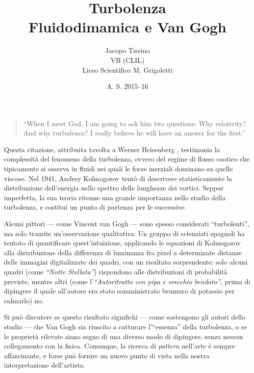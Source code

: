 \documentclass[12pt,a4paper]{article}
\author{Jacopo Tissino \\
VB
(CLIL)\\
Liceo Scientifico M. Grigoletti}
\date{A. S. 2015--16}
\title{\huge{\textbf{Turbolenza}}\\
\Large{Fluidodimamica e Van Gogh}}
\numberwithin{equation}{subsection}
\begin{document}
\maketitle

\begin{quote}
``When I meet God, I am going to ask him two questions: Why relativity? And why turbulence? I really believe he will have an answer for the first.''
\end{quote}

Questa citazione, attribuita tavolta a Werner Heisenberg \cite{heisenberg}, testimonia la complessità del fenomeno della turbolenza, ovvero del regime di flusso caotico che tipicamente si osserva in fluidi nei quali le forze inerziali dominano su quelle viscose. 
Nel 1941, Andrey Kolmogorov tentò di descrivere statisticamente la distribuzione dell'energia nello spettro delle lunghezze dei vortici. Seppur imperfetta, la sua teoria ritenne una grande importanza nello studio della turbolenza, e costituì un punto di partenza per le successive.

Alcuni pittori --- come Vincent van Gogh --- sono spesso considerati ``turbolenti'', ma solo tramite un'osservazione qualitativa. Un gruppo di scienziati spagnoli \cite{study2006} ha tentato di quantificare quest'intuizione, applicando le equazioni di Kolmogorov alla distribuzione della differenza di luminanza fra pixel a determinate distanze delle immagini digitalizzate dei quadri, con un risultato sorprendente: solo alcuni quadri (come \emph{``Notte Stellata''}) rispondono alle distribuzioni di probabilità previste, mentre altri (come l'\emph{``Autoritratto con pipa e orecchio bendato''}, prima di dipingere il quale all'autore era stato somministrato brumuro di potassio per calmarlo) no.

Si può discutere se questo risultato significhi --- come sostengono gli autori dello studio --- che Van Gogh sia riuscito a catturare l'``essenza'' della turbolenza, o se le proprietà rilevate siano segno di una diverso modo di dipingere, senza nessun collegamento con la fisica.
Comunque, la ricerca di \emph{pattern} nell'arte è sempre affascinante, e forse può fornire un nuovo punto di vista nella nostra interpretazione dell'artista.

\vspace{7mm}

\end{document}
